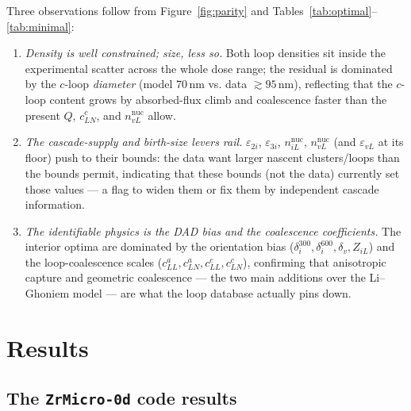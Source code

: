 \documentclass{article}
\begin{document}
Three observations follow from Figure~\ref{fig:parity} and
Tables~\ref{tab:optimal}--\ref{tab:minimal}:
\begin{enumerate}\itemsep2pt
\item \emph{Density is well constrained; size, less so.} Both loop densities sit
inside the experimental scatter across the whole dose range; the residual is
dominated by the $c$-loop \emph{diameter} (model $70\,$nm vs. data
$\gtrsim 95\,$nm), reflecting that the $c$-loop content grows by absorbed-flux
climb and coalescence faster than the present $Q$, $c_{LN}^c$, and
$n_{vL}^{\mathrm{nuc}}$ allow.
\item \emph{The cascade-supply and birth-size levers rail.} $\varepsilon_{2i}$,
$\varepsilon_{3i}$, $n_{iL}^{\mathrm{nuc}}$, $n_{vL}^{\mathrm{nuc}}$ (and
$\varepsilon_{vL}$ at its floor) push to their bounds: the data want larger
nascent clusters/loops than the bounds permit, indicating that these bounds (not the
data) currently set those values — a flag to widen them or fix them by
independent cascade information.
\item \emph{The identifiable physics is the DAD bias and the coalescence
coefficients.} The interior optima are dominated by the orientation bias
($\delta_i^{300},\delta_i^{600},\delta_v,Z_{iL}$) and the loop-coalescence scales
($c_{LL}^a,c_{LN}^a,c_{LL}^c,c_{LN}^c$), confirming that anisotropic capture and
geometric coalescence — the two main additions over the Li–Ghoniem model —
are what the loop database actually pins down.
\end{enumerate}

\section{Results}
\label{sec:resultsAll}

\subsection{The \texttt{ZrMicro-0d} code results}
\end{document}
